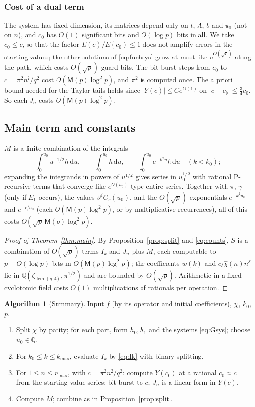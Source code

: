 \documentclass[11pt,reqno]{amsart}
\theoremstyle{definition}
\newtheorem{algorithm}[theorem]{Algorithm}
\theoremstyle{remark}
\newcommand{\dd}{\,\mathrm{d}}
\newcommand{\QQ}{\mathbb{Q}}
\newcommand{\Mul}{\mathsf{M}}
\begin{document}
\subsubsection{Cost of a dual term} The system has fixed dimension, its matrices depend only on $t$, $A$, $b$ and
$u_0$ (not on $n$), and $c_0$ has $O(1)$ significant bits and $O(\log p)$ bits in all. We take $c_0 \le c$, so that the
factor $E(c)/E(c_0) \le 1$ does not amplify errors in the starting values; the other solutions of
\eqref{eq:fuchsys} grow at most like $e^{O(\sqrt c)}$ along the path, which costs $O(\sqrt p)$ guard bits. The
bit-burst steps from $c_0$ to $c = \pi^2n^2/q^2$ cost $O(\Mul(p)\log^2p)$, and $\pi^2$ is computed once.
The a priori bound needed for the Taylor tails holds since $|Y(c)| \le C e^{O(1)}$ on
$|c - c_0| \le \frac34 c_0$. So each $J_n$ costs $O(\Mul(p)\log^2p)$.

\subsection{Main term and constants}
$M$ is a finite combination of the integrals
\[
  \int_0^{u_0} u^{-1/2} h\dd u, \qquad \int_0^{u_0} h\dd u, \qquad \int_0^{u_0}e^{-k^2u}h\dd u \quad (k < k_0);
\]
expanding the integrands in powers of $u^{1/2}$ gives series in $u_0^{1/2}$ with rational P-recursive terms that
converge like $e^{O(u_0)}$-type entire series. Together with $\pi$, $\gamma$ (only if $E_1$ occurs), the values
$\vartheta^iG_\varepsilon(u_0)$, and the $O(\sqrt p)$ exponentials $e^{-k^2u_0}$ and $e^{-c/u_0}$ (each
$O(\Mul(p)\log^2 p)$, or by multiplicative recurrences), all of this costs $O(\sqrt p\,\Mul(p)\log^2p)$.

\begin{proof}[Proof of Theorem~\ref{thm:main}]
By Proposition~\ref{prop:split} and \eqref{eq:counts}, $S$ is a combination of $O(\sqrt p)$ terms $I_k$
and $J_n$ plus $M$, each computable to $p + O(\log p)$ bits in $O(\Mul(p)\log^2p)$; the coefficients
$w(k)$ and $c_\delta\hat\chi(n)n^\delta$ lie in $\QQ(\zeta_{\operatorname{lcm}(q,4)}, \pi^{1/2})$ and are bounded by $O(\sqrt p)$.
Arithmetic in a fixed cyclotomic field costs $O(1)$ multiplications of rationals per operation.
\end{proof}

\begin{algorithm}[Summary]\label{alg:main}
Input $f$ (by its operator and initial coefficients), $\chi$, $k_0$, $p$.
\begin{enumerate}
\item Split $\chi$ by parity; for each part, form $h_0, h_1$ and the systems \eqref{eq:Gsys}; choose $u_0 \in \QQ$.
\item For $k_0 \le k \le k_{\max}$, evaluate $I_k$ by \eqref{eq:Ik} with binary splitting.
\item For $1 \le n \le n_{\max}$, with $c = \pi^2n^2/q^2$: compute $Y(c_0)$ at a rational $c_0 \approx c$ from
the starting value series; bit-burst to $c$; $J_n$ is a linear form in $Y(c)$.
\item Compute $M$; combine as in Proposition~\ref{prop:split}.
\end{enumerate}
\end{algorithm}
\end{document}
